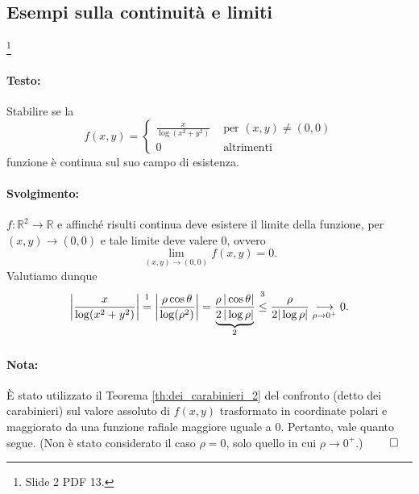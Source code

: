 
\subsection{Esempi sulla continuità e limiti}

\begin{example}\footnote{Slide 2 PDF 13.}
	\paragraph{Testo:} Stabilire se la
	\begin{equation*}
		f(x,y)=
		\begin{cases}
			\frac{x}{\log(x^2+y^2)}&\text{ per } (x,y)\neq(0,0)\\
			0 &\text{ altrimenti}
		\end{cases}
	\end{equation*}
	funzione è continua sul suo campo di esistenza.
	\paragraph{Svolgimento:} $f:\mathbb{R}^2\rightarrow\mathbb{R}$ e affinché risulti continua deve esistere il limite della funzione, per $(x,y)\rightarrow(0,0)$ e tale limite deve valere 0, ovvero
	\begin{equation*}
		\lim\limits_{(x,y)\rightarrow(0,0)}f(x,y)=0.
	\end{equation*}
	Valutiamo dunque
	\begin{equation*}
		\left|\frac{x}{\log(x^2+y^2)}\right|\overset{\footnotemark}{=} \left|\frac{\rho \cos\theta}{\log(\rho^2)}\right| = \frac{\rho\,|\cos\theta|}{\underbrace{2\,|\log\rho|}_{\footnotemark}}\overset{\footnotemark}{\leq} \frac{\rho}{2|\log\rho|}\underset{\rho\rightarrow0^+}{\longrightarrow}0 .
	\end{equation*}
	\addtocounter{footnote}{-2}
	
	
	
	\paragraph{Nota:} È stato utilizzato il Teorema \ref{th:dei_carabinieri_2} del confronto (detto dei carabinieri) sul valore assoluto di $f(x,y)$ trasformato in coordinate polari e maggiorato da una funzione rafiale maggiore uguale a 0. Pertanto, vale quanto segue. (Non è stato considerato il caso $\rho=0$, solo quello in cui $\rho\rightarrow 0^+$.) $\qed$
	

\end{example}
